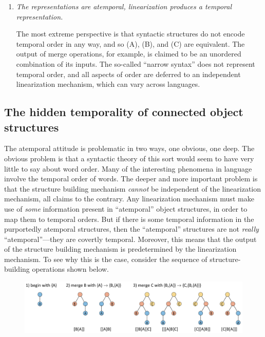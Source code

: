 \begin{enumerate}
\item \textit{The representations are atemporal, linearization produces a temporal representation.}

  The most extreme perspective is that syntactic structures do not encode temporal order in any way, and so (A), (B), and (C) are equivalent. The output of merge operations, for example, is claimed to be an unordered combination of its inputs. The so-called “narrow syntax” does not represent temporal order, and all aspects of order are deferred to an independent linearization mechanism, which can vary across languages. 
\end{enumerate}


\subsection{The hidden temporality of connected object structures}

The atemporal attitude is problematic in two ways, one obvious, one deep. The obvious problem is that a syntactic theory of this sort would seem to have very little to say about word order. Many of the interesting phenomena in language involve the temporal order of words. The deeper and more important problem is that the structure building mechanism \textit{cannot} be independent of the linearization mechanism, all claims to the contrary. Any linearization mechanism must make use of \textit{some} information present in “atemporal” object structures, in order to map them to temporal orders. But if there is some temporal information in the purportedly atemporal structures, then the “atemporal” structures are not \textit{really} “atemporal”—they are covertly temporal. Moreover, this means that the output of the structure building mechanism is predetermined by the linearization mechanism. To see why this is the  case, consider the sequence of structure-building operations shown below.

  
\begin{figure}
\includegraphics[width=\textwidth]{figures/Tilsen-img42.png}
\caption{\missingcaption}
\label{fig:}
\end{figure}
 

